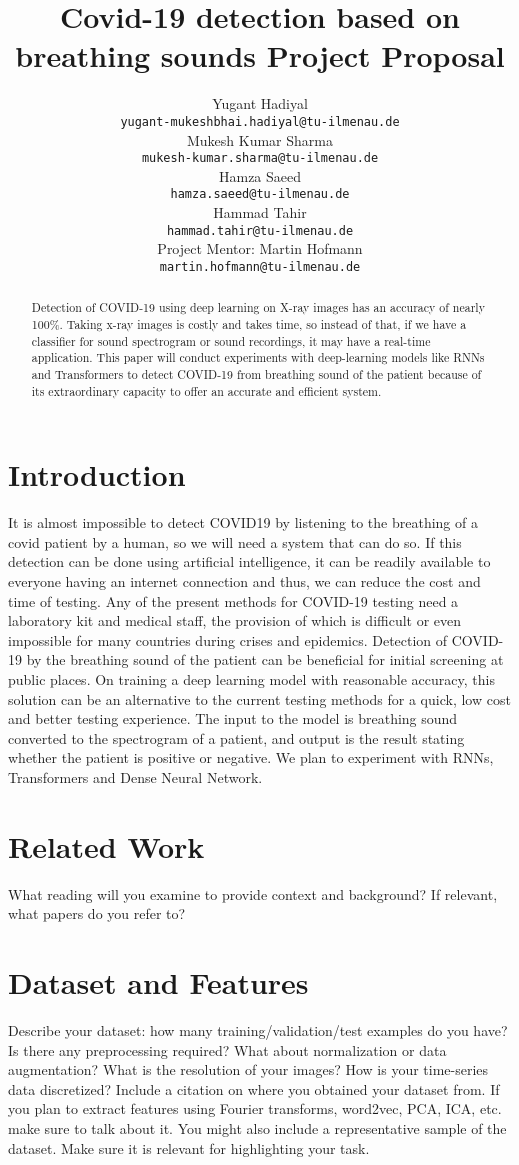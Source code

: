 \documentclass{article}
\title{Covid-19 detection based on breathing sounds Project Proposal}
\author{
  Yugant Hadiyal
    \\
  \texttt{yugant-mukeshbhai.hadiyal@tu-ilmenau.de} \\
  \And
  Mukesh Kumar Sharma \\
  \texttt{mukesh-kumar.sharma@tu-ilmenau.de} \\
\And
  Hamza Saeed\\
  \texttt{hamza.saeed@tu-ilmenau.de} \\
  \And
  Hammad Tahir \\
  \texttt{hammad.tahir@tu-ilmenau.de} \\

  \AND
  Project Mentor: Martin Hofmann\\ 
  \texttt{martin.hofmann@tu-ilmenau.de} \\
}
\begin{document}
\maketitle

\begin{abstract}

Detection of COVID-19 using deep learning on X-ray images has an accuracy of nearly 100\%. Taking x-ray images is costly and takes time, so instead of that, if we have a classifier for sound spectrogram or sound recordings, it may have a real-time application. This paper will conduct experiments with deep-learning models like RNNs and Transformers to detect COVID-19 from breathing sound of the patient because of its extraordinary capacity to offer an accurate and efficient system.

\end{abstract}


\section{Introduction}	
It is almost impossible to detect COVID19 by listening to the breathing of a covid patient by a human, so we will need a system that can do so. If this detection can be done using artificial intelligence, it can be readily available to everyone having an internet connection and thus, we can reduce the cost and time of testing.
Any of the present methods for COVID-19 testing need a laboratory kit and medical staff, the provision of which is difficult or even impossible for many countries during crises and epidemics. Detection of COVID-19 by the breathing sound of the patient can be beneficial for initial screening at public places. On training a deep learning model with reasonable accuracy, this solution can be an alternative to the current testing methods for a quick, low cost and better testing experience.
The input to the model is breathing sound converted to the spectrogram of a patient, and output is the result stating whether the patient is positive or negative. We plan to experiment with RNNs, Transformers and Dense Neural Network.


\section{Related Work}
What reading will you examine to provide context and background?
If relevant, what papers do you refer to?

\section{Dataset and Features}
Describe your dataset: how many training/validation/test examples do you have?
Is there any preprocessing required? 
What about normalization or data augmentation?
What is the resolution of your images? 
How is your time-series data discretized? 
Include a citation on where you obtained your dataset from. 
If you plan to extract features using Fourier transforms, word2vec, PCA, ICA, etc. make sure to talk about it. 
You might also include a representative sample of the dataset. Make sure it is relevant for highlighting your task.
\end{document}
